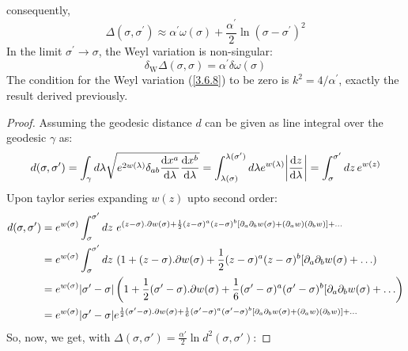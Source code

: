 consequently,
\begin{equation}
	\Delta\left(\sigma, \sigma^{\prime}\right) \approx \alpha^{\prime} \omega(\sigma)+\frac{\alpha^{\prime}}{2} \ln \left(\sigma-\sigma^{\prime}\right)^{2}
\end{equation}
In the limit $\sigma^{\prime} \rightarrow \sigma$, the Weyl variation is non-singular:
\begin{equation}\label{3.6.11}
	\delta_{\mathrm{W}} \Delta(\sigma, \sigma)=\alpha^{\prime} \delta \omega(\sigma)
\end{equation}
The condition for the Weyl variation (\ref{3.6.8}) to be zero is $k^{2}=4 / \alpha^{\prime}$, exactly the result derived previously.
\begin{tcolorbox}[breakable]
	\begin{proof}
		Assuming the geodesic distance $d$ can be given as line integral over the geodesic $\gamma$ as:
		\begin{equation}
			d(\sigma, \sigma') = \int_{\gamma} d\lambda\sqrt{e^{2w(\lambda)}\delta_{ab}\dv{x^a}{\lambda}\dv{x^b}{\lambda}}= \int_{\lambda(\sigma)}^{\lambda(\sigma')} d\lambda e^{w(\lambda)}\abs{\dv{z}{\lambda}}=\int_\sigma^{\sigma'} dz\,e^{w(z)}
		\end{equation}
		Upon taylor series expanding $w(z)$ upto second order:
		\begin{align}
			d(\sigma, \sigma') &= e^{w(\sigma)} \int_\sigma^{\sigma'} dz ~ e^{(z-\sigma).\partial w(\sigma) + \frac{1}{2}(z-\sigma)^a(z-\sigma)^b [\partial_a \partial_b w(\sigma)+(\partial_a w)(\partial_b w)]+\ldots}\notag\\
			& = e^{w(\sigma)} \int_\sigma^{\sigma'} dz ~ ( 1 + (z-\sigma).\partial w(\sigma) + \frac{1}{2}(z-\sigma)^a(z-\sigma)^b[\partial_a \partial_b w(\sigma)%
			+\ldots) \notag\\
			&=e^{w(\sigma)} |\sigma' - \sigma|\left(1 + \frac{1}{2}(\sigma'-\sigma).\partial w(\sigma) +  \frac{1}{6}(\sigma'-\sigma)^a(\sigma'-\sigma)^b[\partial_a \partial_b w(\sigma)%
			+\ldots\right)\notag\\
			&= e^{w(\sigma)} |\sigma' - \sigma| e^{\frac{1}{2}(\sigma'-\sigma).\partial w(\sigma) +  \frac{1}{6}(\sigma'-\sigma)^a(\sigma'-\sigma)^b[\partial_a \partial_b w(\sigma)+(\partial_a w)(\partial_b w)]+\ldots} 
		\end{align}		
		So, now, we get, with $\Delta (\sigma, \sigma') = \frac{\alpha'}{2} \ln d^2(\sigma, \sigma')$:
		

\end{proof}
\end{tcolorbox}
